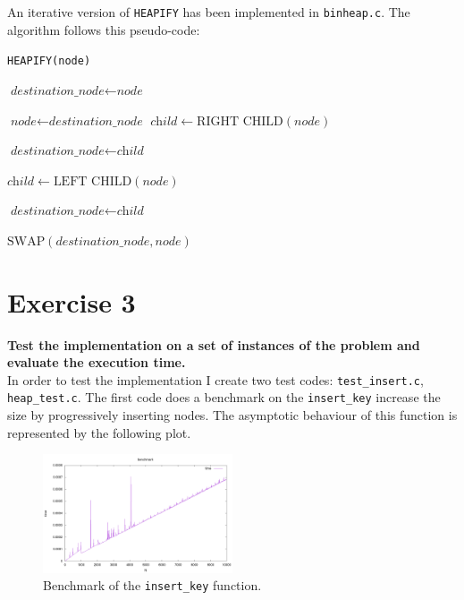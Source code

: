 \documentclass{article}
\begin{document}
	\noindent An iterative version of \texttt{HEAPIFY} has been implemented in \texttt{binheap.c}. The algorithm follows this pseudo-code:
	\newpage
	\begin{algorithm}
		\caption{\texttt{HEAPIFY(node)}}\label{euclid}
	\begin{algorithmic}
		\State $\textit{destination\_node} \gets \textit{node}$
		\Do
		
		\State $\textit{node} \gets \textit{destination\_node}$
		\State $\textit{child} \gets \text{RIGHT CHILD}(\textit{node})$
		
		\State $\textit{destination\_node} \gets \textit{child}$
		\EndIf
		
		\State $\textit{child} \gets \text{LEFT CHILD}(\textit{node})$
		
		\State $\textit{destination\_node} \gets \textit{child}$
		\EndIf
		
		\State $\text{SWAP}(\textit{destination\_node}, \textit{node})$
		\EndIf
		
	\end{algorithmic}
	\end{algorithm}
	
	\section*{Exercise 3}
	\textbf{Test the implementation on a set of instances of the problem and evaluate the execution time.} \\
	
	\noindent In order to test the implementation I create two test codes: \texttt{test\_insert.c}, \texttt{heap\_test.c}. The first code does a benchmark on the \texttt{insert\_key} increase the size by progressively inserting nodes. The asymptotic behaviour of this function is represented by the following plot.
	
	\begin{figure}[h]
		\centering
		\includegraphics[width=0.5\textwidth]{../plot/plot_benchmark.png}  
		\caption{Benchmark of the \texttt{insert\_key} function.}
		\label{plot}
	\end{figure}
	
\end{document}

